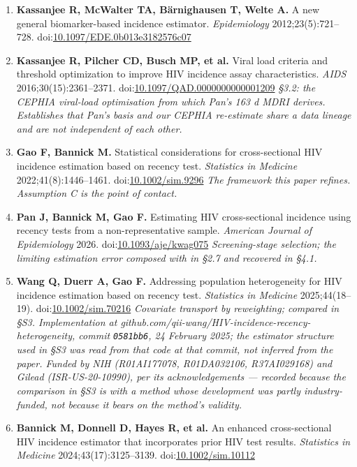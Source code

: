 \begin{enumerate}
\def\labelenumi{\arabic{enumi}.}
\item
  \textbf{Kassanjee R, McWalter TA, Bärnighausen T, Welte A.} A new general biomarker-based incidence estimator. \emph{Epidemiology} 2012;23(5):721--728. doi:\href{https://doi.org/10.1097/EDE.0b013e3182576c07}{10.1097/EDE.0b013e3182576c07}
\item
  \textbf{Kassanjee R, Pilcher CD, Busch MP, et al.} Viral load criteria and threshold optimization to improve HIV incidence assay characteristics. \emph{AIDS} 2016;30(15):2361--2371. doi:\href{https://doi.org/10.1097/QAD.0000000000001209}{10.1097/QAD.0000000000001209}
  \emph{§3.2: the CEPHIA viral-load optimisation from which Pan's 163 d MDRI derives. Establishes that Pan's basis and our CEPHIA re-estimate share a data lineage and are not independent of each other.}
\item
  \textbf{Gao F, Bannick M.} Statistical considerations for cross-sectional HIV incidence estimation based on recency test. \emph{Statistics in Medicine} 2022;41(8):1446--1461. doi:\href{https://doi.org/10.1002/sim.9296}{10.1002/sim.9296}
  \emph{The framework this paper refines. Assumption C is the point of contact.}
\item
  \textbf{Pan J, Bannick M, Gao F.} Estimating HIV cross-sectional incidence using recency tests from a non-representative sample. \emph{American Journal of Epidemiology} 2026. doi:\href{https://doi.org/10.1093/aje/kwag075}{10.1093/aje/kwag075}
  \emph{Screening-stage selection; the limiting estimation error composed with in §2.7 and recovered in §4.1.}
\item
  \textbf{Wang Q, Duerr A, Gao F.} Addressing population heterogeneity for HIV incidence estimation based on recency test. \emph{Statistics in Medicine} 2025;44(18--19). doi:\href{https://doi.org/10.1002/sim.70216}{10.1002/sim.70216}
  \emph{Covariate transport by reweighting; compared in §S3. Implementation at github.com/qii-wang/HIV-incidence-recency-heterogeneity, commit \texttt{0581bb6}, 24 February 2025; the estimator structure used in §S3 was read from that code at that commit, not inferred from the paper. Funded by NIH (R01AI177078, R01DA032106, R37AI029168) and Gilead (ISR-US-20-10990), per its acknowledgements --- recorded because the comparison in §S3 is with a method whose development was partly industry-funded, not because it bears on the method's validity.}
\item
  \textbf{Bannick M, Donnell D, Hayes R, et al.} An enhanced cross-sectional HIV incidence estimator that incorporates prior HIV test results. \emph{Statistics in Medicine} 2024;43(17):3125--3139. doi:\href{https://doi.org/10.1002/sim.10112}{10.1002/sim.10112}

\end{enumerate}
